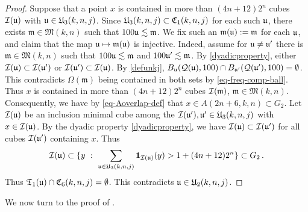 \begin{proof}
    \leanok
    Suppose that a point $x$ is contained in more than $(4n + 12)2^n$ cubes ${\mathcal{I}}({\mathfrak u})$ with ${\mathfrak u} \in {\mathfrak U}_3(k,n,j)$.
    Since ${\mathfrak U}_3(k,n,j) \subset {\mathfrak C}_1(k,n,j)$ for each such ${\mathfrak u}$,
    there exists $\mathfrak{m} \in \mathfrak{M}(k,n)$ such that $100{\mathfrak u} \lesssim \mathfrak{m}$.
    We fix such an $\mathfrak{m}({\mathfrak u}) := \mathfrak{m}$ for each ${\mathfrak u}$, and claim that the map ${\mathfrak u} \mapsto\mathfrak{m}({\mathfrak u})$ is injective.
    Indeed, assume for ${\mathfrak u}\neq {\mathfrak u}'$ there is $\mathfrak{m} \in \mathfrak{M}(k,n)$ such that
    $100{\mathfrak u} \lesssim \mathfrak{m}$ and $100{\mathfrak u}' \lesssim \mathfrak{m}$. By \eqref{dyadicproperty},
    either ${\mathcal{I}}({\mathfrak u}) \subset {\mathcal{I}}({\mathfrak u}')$ or ${\mathcal{I}}({\mathfrak u}') \subset {\mathcal{I}}({\mathfrak u})$.
    By \eqref{defunkj}, $B_{{\mathfrak u}}({\mathcal{Q}}({\mathfrak u}),100) \cap B_{{\mathfrak u}'}({\mathcal{Q}}({\mathfrak u}'), 100) = \emptyset$.
    This contradicts $\Omega(\mathfrak{m})$ being contained in both sets by \eqref{eq-freq-comp-ball}.
    Thus $x$ is contained in more than $(4n + 12)2^n$ cubes ${\mathcal{I}}(\mathfrak{m})$, $\mathfrak{m} \in \mathfrak{M}(k,n)$.
    Consequently, we have by \eqref{eq-Aoverlap-def} that $x \in A(2n + 6, k,n) \subset G_2$.
    Let ${\mathcal{I}}({\mathfrak u})$ be an inclusion minimal cube among the ${\mathcal{I}}({\mathfrak u}'), {\mathfrak u}' \in {\mathfrak U}_3(k,n,j)$ with $x \in {\mathcal{I}}({\mathfrak u})$.
    By the dyadic property \eqref{dyadicproperty}, we have ${\mathcal{I}}({\mathfrak u}) \subset {\mathcal{I}}({\mathfrak u}')$ for all cubes ${\mathcal{I}}({\mathfrak u}')$ containing $x$. Thus
    $$
        {\mathcal{I}}({\mathfrak u}) \subset \{y \ : \ \sum_{{\mathfrak u} \in {\mathfrak U}_3(k,n,j)} \mathbf{1}_{{\mathcal{I}}({\mathfrak u})}(y) > 1 + (4n+12)2^{n}\} \subset G_2\,.
    $$
    Thus $\mathfrak{T}_1({\mathfrak u}) \cap {\mathfrak C}_6(k,n,j) = \emptyset$.
    This contradicts ${\mathfrak u} \in {\mathfrak U}_2(k,n,j)$.
\end{proof}
We now turn to the proof of .
